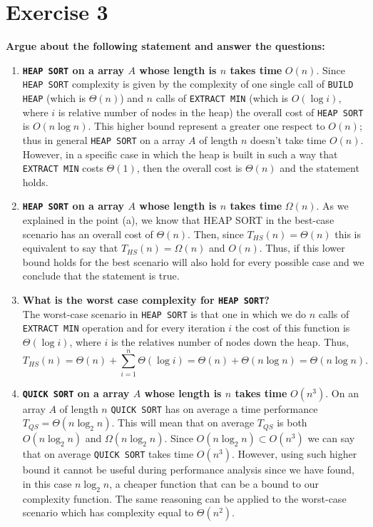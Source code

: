 \documentclass{article}
\begin{document}
	\section*{Exercise 3}
	\textbf{Argue about the following statement and answer the questions:}
	\begin{enumerate}[label=(\alph*)]
		\item \textbf{\texttt{HEAP SORT} on a array $A$ whose length is $n$ takes time} $O(n)$. 
		Since \texttt{HEAP SORT} complexity is given by the complexity of one single call of \texttt{BUILD HEAP} (which is $\Theta(n)$) and $n$ calls of \texttt{EXTRACT MIN} (which is $O(\log i)$, where $i$ is relative number of nodes in the heap) the overall cost of \texttt{HEAP SORT} is $O(n\log n)$. This higher bound represent a greater one respect to $O(n)$; thus in general \texttt{HEAP SORT} on a array $A$ of length $n$ doesn't take time $O(n)$. \\
		However, in a specific case in which the heap is built in such a way that \texttt{EXTRACT MIN} costs $\Theta(1)$, then the overall cost is $\Theta(n)$ and the statement holds.
		
		 
		\item \textbf{\texttt{HEAP SORT} on a array $A$ whose length is $n$ takes time} $\Omega(n)$. 
		As we explained in the point (a), we know that HEAP SORT in the best-case scenario has an overall cost of $\Theta(n)$. Then, since $T_{HS} (n) = \Theta(n)$ this is equivalent to say that  $T_{HS} (n) = \Omega(n)$ and $O(n)$. Thus, if this lower bound holds for the best scenario will also hold for every possible case and we conclude that the statement is true. 
		
		\item \textbf{What is the worst case complexity for \texttt{HEAP SORT}?}\\
		The worst-case scenario in \texttt{HEAP SORT} is that one in which we do $n$ calls of \texttt{EXTRACT MIN} operation and for every iteration $i$ the cost of this function is $\Theta(\log i)$, where $i$ is the relatives number of nodes down the heap. Thus,
		\begin{equation*}
		T_{HS} (n) = \Theta(n) + \sum_{i=1}^{n} \Theta(\log i) = \Theta(n) + \Theta(n\log n) = \Theta(n\log n).  
		\end{equation*}
		
		\item \textbf{\texttt{QUICK SORT} on a array $A$ whose length is $n$ takes time} $O(n^3)$. 
		On an array $A$ of length $n$ \texttt{QUICK SORT} has on average a time performance $T_{QS} = \Theta(n \log_2 n) $.  This will mean that on average $T_{QS}$ is both $O(n\log_2 n)$ and $\Omega(n\log_2 n)$. Since $O(n\log_2 n) \subset O(n^3)$ we can say that on  average \texttt{QUICK SORT} takes time $O(n^3)$. However, using such higher bound it cannot be useful during performance analysis since we have found, in this case $n\log_2 n$, a cheaper function that can be a bound to our complexity function. 
		The same reasoning can be applied to the worst-case scenario which has complexity equal to $\Theta(n^2) $.
		

\end{enumerate}
\end{document}

